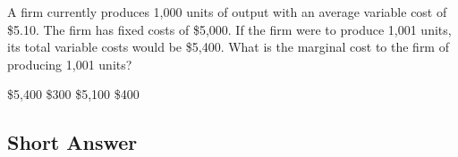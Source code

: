 \documentclass[addpoints,11pt]{exam}
\theoremstyle{definition}
\newcommand{\dd}[1]{}
\begin{document}
\begin{questions}
			\question A firm currently produces 1,000 units of output with an average variable cost of \$5.10. The firm has fixed costs of \$5,000. If the firm were to produce 1,001 units, its total variable costs would be \$5,400. What is the marginal cost to the firm of producing 1,001 units?
			
			\begin{choices}
				\choice \$5,400
				\CorrectChoice \$300
				\choice \$5,100
				\choice \$400
			\end{choices}
			
			\dd{At 1,000 units, $VC = 1,000 \times 5.10 = \$5,100.$ $MC = \frac{\Delta VC}{\Delta Q} = \frac{(5,400 - 5,100)}{1} = \$300.$}
			
		\end{questions}
		
		\subsection*{Short Answer}
		
\end{document}

